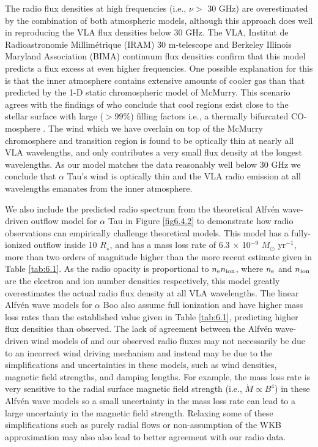 The radio flux densities at high frequencies (i.e., $\nu >$ 30 GHz) are overestimated by the combination of both atmospheric models, although this approach does well in reproducing the VLA flux densities below 30 GHz. The VLA, Institut de Radioastronomie Millim\'{e}trique (IRAM) 30 m-telescope and Berkeley Illinois Maryland Association (BIMA) continuum flux densities confirm that this model predicts a flux excess at even higher frequencies. One possible explanation for this is that the inner atmosphere contains extensive amounts of cooler gas than that predicted by the 1-D static chromospheric model of McMurry. This scenario agrees with the findings of \cite{wiedemann_1994} who conclude that cool regions exist close to the stellar surface with large ($> 99 \%$) filling factors i.e., a thermally bifurcated CO-mosphere \citep{ayres_1996}. The wind which we have overlain on top of the McMurry chromosphere and transition region is found to be optically thin at nearly all VLA wavelengths, and only contributes a very small flux density at the longest wavelengths. As our model matches the data reasonably well below 30 GHz we conclude that $\alpha$ Tau's wind is optically thin and the VLA radio emission at all wavelengths emanates from the inner atmosphere. 

We also include the predicted radio spectrum from the theoretical Alfv\'{e}n wave-driven outflow model for $\alpha$ Tau \citep{krogulec_1989} in Figure \ref{fig6.4.2} to demonstrate how radio observations can empirically challenge theoretical models. This model has a fully-ionized outflow inside 10 $R_{\star}$, and has a mass loss rate of  6.3 $\times$ 10$^{-9}$ $M_{\odot}$ yr$^{-1}$, more than two orders of magnitude higher than the more recent estimate given in Table \ref{tab:6.1}. As the radio opacity is proportional to $n _{\rm{e}} n _{\rm{ion}}$, where $n_{\rm{e}}$ and $n_{\rm{ion}}$ are the electron and ion number densities respectively, this model greatly overestimates the actual radio flux density at all VLA wavelengths. The linear Alfv\'{e}n wave models for $\alpha$ Boo \citep{krogulec_1988} also assume full ionization and have higher mass loss rates than the established value given in Table \ref{tab:6.1}, predicting higher flux densities than observed. The lack of agreement between the Alfv\'en wave-driven wind models of \cite{krogulec_1988,krogulec_1989} and our observed radio fluxes may not necessarily be due to an incorrect  wind driving mechanism and instead may be due to the simplifications and  uncertainties in these models, such as wind densities, magnetic field strengths, and damping lengths. For example, the mass loss rate is very sensitive to the radial surface magnetic field strength (i.e., $\dot{M} \propto B^4$) in these Alfv\'en wave models \citep{holzer_1983} so a small uncertainty in the mass loss rate can lead to a large uncertainty in the magnetic field strength. Relaxing some of these simplifications such as purely radial flows or non-assumption of the WKB approximation \citep{charbonneau_1995} may also also lead to better agreement with our radio data.

